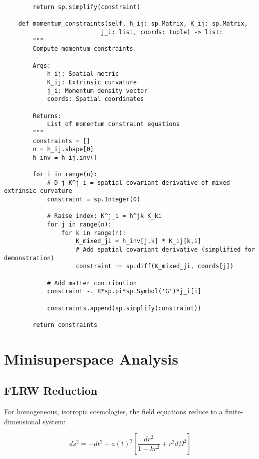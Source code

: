 \documentclass[11pt,a4paper]{article}
\theoremstyle{definition}
\theoremstyle{remark}
\begin{document}
\begin{lstlisting}
        return sp.simplify(constraint)
    
    def momentum_constraints(self, h_ij: sp.Matrix, K_ij: sp.Matrix,
                           j_i: list, coords: tuple) -> list:
        """
        Compute momentum constraints.
        
        Args:
            h_ij: Spatial metric
            K_ij: Extrinsic curvature
            j_i: Momentum density vector
            coords: Spatial coordinates
            
        Returns:
            List of momentum constraint equations
        """
        constraints = []
        n = h_ij.shape[0]
        h_inv = h_ij.inv()
        
        for i in range(n):
            # D_j K^j_i = spatial covariant derivative of mixed extrinsic curvature
            constraint = sp.Integer(0)
            
            # Raise index: K^j_i = h^jk K_ki
            for j in range(n):
                for k in range(n):
                    K_mixed_ji = h_inv[j,k] * K_ij[k,i]
                    # Add spatial covariant derivative (simplified for demonstration)
                    constraint += sp.diff(K_mixed_ji, coords[j])
            
            # Add matter contribution
            constraint -= 8*sp.pi*sp.Symbol('G')*j_i[i]
            
            constraints.append(sp.simplify(constraint))
        
        return constraints
\end{lstlisting}

\section{Minisuperspace Analysis}

\subsection{FLRW Reduction}

For homogeneous, isotropic cosmologies, the field equations reduce to a finite-dimensional system:

\begin{equation}
ds^2 = -dt^2 + a(t)^2 \left[ \frac{dr^2}{1-kr^2} + r^2 d\Omega^2 \right]
\end{equation}
\end{document}
